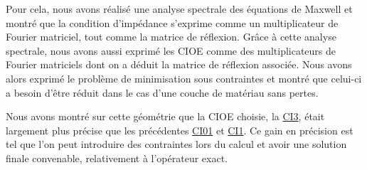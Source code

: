 Pour cela, nous avons réalisé une analyse spectrale des équations de Maxwell et montré que la condition d'impédance s'exprime comme un multiplicateur de Fourier matriciel, tout comme la matrice de réflexion. Grâce à cette analyse spectrale, nous avons aussi exprimé les CIOE comme des multiplicateurs de Fourier matriciels dont on a déduit la matrice de réflexion associée. Nous avons alors exprimé le problème de minimisation sous contraintes et montré que celui-ci a besoin d'être réduit dans le cas d'une couche de matériau sans pertes.

Nous avons montré sur cette géométrie que la CIOE choisie, la \hyperlink{ci3}{CI3}, était largement plus précise que les précédentes \hyperlink{ci01}{CI01} et \hyperlink{ci1}{CI1}. Ce gain en précision est tel que l'on peut introduire des contraintes lors du calcul et avoir une solution finale convenable, relativement à l'opérateur exact.
